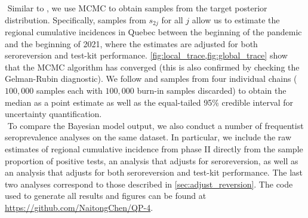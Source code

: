 \newline$ $
Similar to \cite{meyer2022adjusting}, we use MCMC to obtain samples from the target posterior distribution. Specifically, samples from $s_{2j}$ for all $j$ allow us to estimate the regional cumulative incidences in Quebec between the beginning of the pandemic and the beginning of 2021, where the estimates are adjusted for both seroreversion and test-kit performance. \cref{fig:local_trace,fig:global_trace} show that the MCMC algorithm has converged (this is also confirmed by checking the Gelman-Rubin diagnostic). We follow \cite{meyer2022adjusting} and samples from four individual chains ($100,000$ samples each with $100,000$ burn-in samples discarded) to obtain the median as a point estimate as well as the equal-tailed 95\% credible interval for uncertainty quantification.\\
\newline$ $
To compare the Bayesian model output, we also conduct a number of frequentist seroprevalence analyses on the same dataset. In particular, we include the raw estimates of regional cumulative incidence from phase II directly from the sample proportion of positive tests, an analysis that adjusts for seroreversion, as well as an analysis that adjusts for both seroreversion and test-kit performance. The last two analyses correspond to those described in \cref{sec:adjust_reversion}. The code used to generate all results and figures can be found at \url{https://github.com/NaitongChen/QP-4}.

